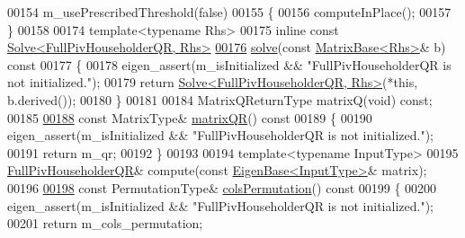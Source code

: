 \begin{DoxyCode}
00154         m\_usePrescribedThreshold(false)
00155     \{
00156       computeInPlace();
00157     \}
00158 
00174     \textcolor{keyword}{template}<\textcolor{keyword}{typename} Rhs>
00175     \textcolor{keyword}{inline} \textcolor{keyword}{const} \hyperlink{group___core___module_class_eigen_1_1_solve}{Solve<FullPivHouseholderQR, Rhs>}
\hyperlink{group___q_r___module_a6f1b0a116c78e642e3d2a100a29d1a4a}{00176}     \hyperlink{group___q_r___module_a6f1b0a116c78e642e3d2a100a29d1a4a}{solve}(\textcolor{keyword}{const} \hyperlink{group___core___module_class_eigen_1_1_matrix_base}{MatrixBase<Rhs>}& b)\textcolor{keyword}{ const}
00177 \textcolor{keyword}{    }\{
00178       eigen\_assert(m\_isInitialized && \textcolor{stringliteral}{"FullPivHouseholderQR is not initialized."});
00179       \textcolor{keywordflow}{return} \hyperlink{group___core___module_class_eigen_1_1_solve}{Solve<FullPivHouseholderQR, Rhs>}(*\textcolor{keyword}{this}, b.derived());
00180     \}
00181 
00184     MatrixQReturnType matrixQ(\textcolor{keywordtype}{void}) \textcolor{keyword}{const};
00185 
\hyperlink{group___q_r___module_a9c16411e5d8f1fc634a5797018d5aa3e}{00188}     \textcolor{keyword}{const} MatrixType& \hyperlink{group___q_r___module_a9c16411e5d8f1fc634a5797018d5aa3e}{matrixQR}()\textcolor{keyword}{ const}
00189 \textcolor{keyword}{    }\{
00190       eigen\_assert(m\_isInitialized && \textcolor{stringliteral}{"FullPivHouseholderQR is not initialized."});
00191       \textcolor{keywordflow}{return} m\_qr;
00192     \}
00193 
00194     \textcolor{keyword}{template}<\textcolor{keyword}{typename} InputType>
00195     \hyperlink{group___q_r___module_class_eigen_1_1_full_piv_householder_q_r}{FullPivHouseholderQR}& compute(\textcolor{keyword}{const} \hyperlink{group___core___module_struct_eigen_1_1_eigen_base}{EigenBase<InputType>}& 
      matrix);
00196 
\hyperlink{group___q_r___module_abeda6d91e196c13d4dd8b7542fef3e17}{00198}     \textcolor{keyword}{const} PermutationType& \hyperlink{group___q_r___module_abeda6d91e196c13d4dd8b7542fef3e17}{colsPermutation}()\textcolor{keyword}{ const}
00199 \textcolor{keyword}{    }\{
00200       eigen\_assert(m\_isInitialized && \textcolor{stringliteral}{"FullPivHouseholderQR is not initialized."});
00201       \textcolor{keywordflow}{return} m\_cols\_permutation;

\end{DoxyCode}
